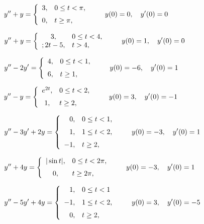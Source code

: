 \begin{exerciselist}
  \item\label{exer:8.5.1} $\displaystyle{y''+y=\left\{\begin{array}{cl}3,&0\le t<\pi,\\[2\jot]0,&t\ge\pi,\end{array}\right.\qquad y(0)=0,\quad y'(0)=0}$

  \item\label{exer:8.5.2} $\displaystyle{y''+y=\left\{\begin{array}{cl}3,&0\le t<4,\\;2t-5,&t>4,\end{array}\right.\qquad y(0)=1,\quad y'(0)=0}$

  \item\label{exer:8.5.3} $\displaystyle{y''-2y'=\left\{\begin{array}{cl}4,&0\le t<1,\\[2\jot]6,&t\ge1,\end{array}\right.\qquad y(0)=-6,\quad y'(0)=1}$

  \item\label{exer:8.5.4} $\displaystyle{y''-y=\left\{\begin{array}{cl}e^{2t},&0\le t<2,\\[2\jot]1,&t\ge2,\end{array}\right.\qquad y(0)=3,\quad y'(0)=-1 }$

  \item\label{exer:8.5.5} $\displaystyle{y''-3y'+2y=\left\{\begin{array}{rl}0,&0\le t<1,\\[2\jot]1,&1\le t<2,\\[2\jot]-1,&t\ge2,\end{array}\right.\qquad y(0)=-3,\quad y'(0)=1}$

  \item\label{exer:8.5.6} \CGex $\displaystyle{y''+4y=\left\{\begin{array}{cl}|\sin t|,&0\le t<2\pi,\\[2\jot]0,&t\ge2\pi,\end{array}\right.\qquad y(0)=-3,\quad y'(0)=1}$

  \item\label{exer:8.5.7} $\displaystyle{y''-5y'+4y=\left\{\begin{array}{rl}1,&0\le t<1\\[2\jot]-1,&1\le t<2,\\[2\jot]0,&t\ge2,\end{array}\right.\qquad y(0)=3,\quad y'(0)=-5}$


\end{exerciselist}
